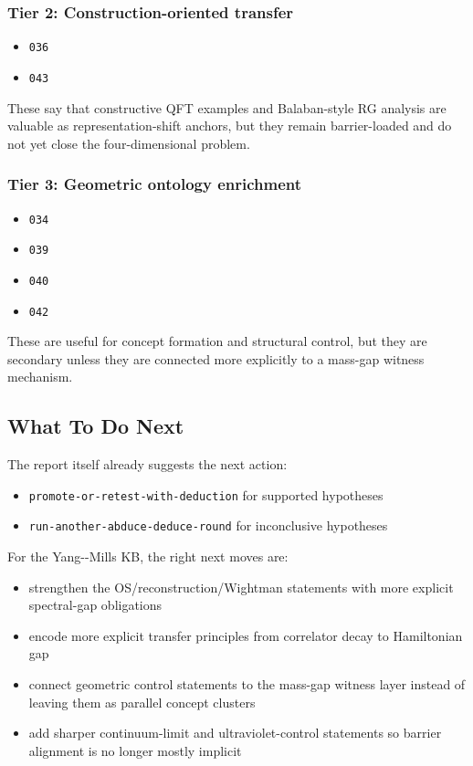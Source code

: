 \documentclass[
]{article}
\providecommand{\tightlist}{%
  \setlength{\itemsep}{0pt}\setlength{\parskip}{0pt}}
\begin{document}
\subsubsection{Tier 2: Construction-oriented
transfer}\label{tier-2-construction-oriented-transfer}

\begin{itemize}
\tightlist
\item
  \texttt{036}
\item
  \texttt{043}
\end{itemize}

These say that constructive QFT examples and Balaban-style RG analysis
are valuable as representation-shift anchors, but they remain
barrier-loaded and do not yet close the four-dimensional problem.

\subsubsection{Tier 3: Geometric ontology
enrichment}\label{tier-3-geometric-ontology-enrichment}

\begin{itemize}
\tightlist
\item
  \texttt{034}
\item
  \texttt{039}
\item
  \texttt{040}
\item
  \texttt{042}
\end{itemize}

These are useful for concept formation and structural control, but they
are secondary unless they are connected more explicitly to a mass-gap
witness mechanism.

\subsection{What To Do Next}\label{what-to-do-next}

The report itself already suggests the next action:

\begin{itemize}
\tightlist
\item
  \texttt{promote-or-retest-with-deduction} for supported hypotheses
\item
  \texttt{run-another-abduce-deduce-round} for inconclusive hypotheses
\end{itemize}

For the Yang-\/-Mills KB, the right next moves are:

\begin{itemize}
\tightlist
\item
  strengthen the OS/reconstruction/Wightman statements with more
  explicit spectral-gap obligations
\item
  encode more explicit transfer principles from correlator decay to
  Hamiltonian gap
\item
  connect geometric control statements to the mass-gap witness layer
  instead of leaving them as parallel concept clusters
\item
  add sharper continuum-limit and ultraviolet-control statements so
  barrier alignment is no longer mostly implicit
\end{itemize}
\end{document}
